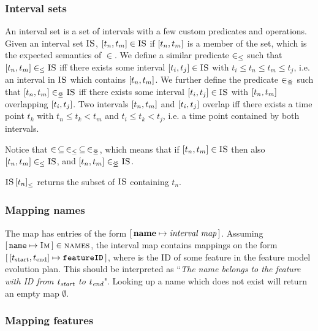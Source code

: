 \subsubsection{Interval sets}
\label{subsub:interval-sets}
An interval set is a set of intervals with a few custom predicates and operations. Given an interval set $\textsc{IS}$, $\interval{t_n}{t_m} \in \map{IS}$ if $\interval{t_n}{t_m}$ is a member of the set, which is the expected semantics of $\in$. We define a similar predicate $\in_\leq$ such that $\interval{t_n}{t_m} \inn \map{IS}$ iff there exists some interval $\interval{t_i}{t_j} \in \map{IS}$ with $t_i \leq t_n \leq t_m \leq t_j$, i.e. an interval in $\textsc{IS}$ which contains $\interval{t_n}{t_m}$. We further define the predicate $\in_{\leq\!\!\!\!\geq}$ such that $\interval{t_n}{t_m} \innr \map{IS}$ iff there exists some interval $\interval{t_i}{t_j} \in \map{IS}$ with $\interval{t_n}{t_m}$ overlapping $\interval{t_i}{t_j}$. Two intervals $\interval{t_n}{t_m}$ and $\interval{t_i}{t_j}$ overlap iff there exists a time point $t_k$ with $t_n \leq t_k < t_m$ and $t_i \leq t_k < t_j$, i.e. a time point contained by both intervals.

Notice that $\in \, \subseteq \, \in_\leq \, \subseteq \, \in_{\leq\!\!\!\!\geq}$, which means that if $\interval{t_n}{t_m} \in \map{IS}$ then also $\interval{t_n}{t_m} \inn \map{IS}$, and $\interval{t_n}{t_m} \innr \map{IS}$.

${\textsc{IS} \left[ t_n \right]}_{\leq}$ returns the subset of $\textsc{IS}$ containing $t_n$.

\subsubsection{Mapping names}
\label{subsub:mapping-names}

The \names{} map has entries of the form $[ \,\textbf{name}{} \mapsto \textit{interval map}\, ]$. Assuming $[ \,\texttt{name} \mapsto \textsc{Im}\, ] \in \textsc{names}$, the interval map  contains mappings on the form $\intervalmapping{t_\text{start}}{t_\text{end}}{\var{featureID}}$, where  is the ID of some feature in the feature model evolution plan. This should be interpreted as ``\emph{The name \emph{} belongs to the feature with ID \emph{} from $t_{\emph{\text{start}}}$ to $t_{\emph{\text{end}}}$}". Looking up a name which does not exist will return an empty map $\emptyset$.

\subsubsection{Mapping features}
\label{subsub:mapping-features}

